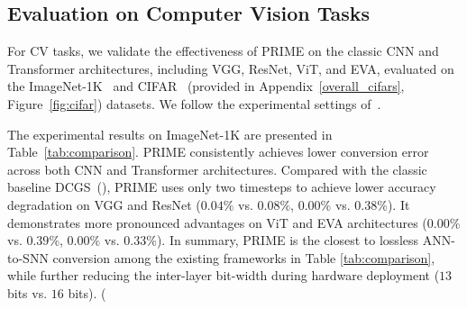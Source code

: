\subsection{Evaluation on Computer Vision Tasks}

For CV tasks, we validate the effectiveness of PRIME on the classic CNN and Transformer architectures, including VGG, ResNet, ViT, and EVA, evaluated on the ImageNet-1K~\cite{Imagenet} and CIFAR~\cite{cifar} (provided in Appendix~\ref{overall_cifars}, Figure~\ref{fig:cifar}) datasets. We follow the experimental settings of~\cite{ECMT}.










The experimental results on ImageNet-1K are presented in Table~\ref{tab:comparison}.  PRIME consistently achieves lower conversion error across both CNN and Transformer architectures. Compared with the classic baseline DCGS~(\cite{dcgs}), PRIME uses only two timesteps to achieve lower accuracy degradation on VGG and ResNet ($0.04\%$ vs. $0.08\%$, $0.00\%$ vs. $0.38\%$). It demonstrates more pronounced advantages on ViT and EVA architectures ($0.00\%$ vs. $0.39\%$, $0.00\%$ vs. $0.33\%$). In summary, PRIME is the closest to lossless ANN-to-SNN conversion among the existing frameworks in Table \ref{tab:comparison}, while further reducing the inter-layer bit-width during hardware deployment ($13$ bits vs. $16$ bits). (





































































